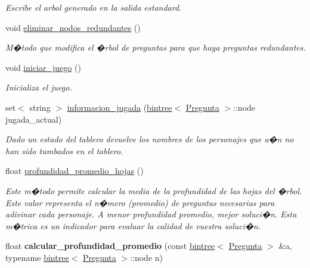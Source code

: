 \begin{DoxyCompactItemize}
\begin{DoxyCompactList}\small\item\em Escribe el arbol generado en la salida estandard. \end{DoxyCompactList}\item 
void \hyperlink{classQuienEsQuien_a010586f119ad0966d35c64382a64e3bc}{eliminar\+\_\+nodos\+\_\+redundantes} ()
\begin{DoxyCompactList}\small\item\em M�todo que modifica el �rbol de preguntas para que haya preguntas redundantes. \end{DoxyCompactList}\item 
void \hyperlink{classQuienEsQuien_a381bcd553e7c0231bb1f33e67ae3c653}{iniciar\+\_\+juego} ()
\begin{DoxyCompactList}\small\item\em Inicializa el juego. \end{DoxyCompactList}\item 
set$<$ string $>$ \hyperlink{classQuienEsQuien_a16816dd39d95ad489e44469f89fabbd4}{informacion\+\_\+jugada} (\hyperlink{classbintree}{bintree}$<$ \hyperlink{classPregunta}{Pregunta} $>$\+::node jugada\+\_\+actual)
\begin{DoxyCompactList}\small\item\em Dado un estado del tablero devuelve los nombres de los personajes que a�n no han sido tumbados en el tablero. \end{DoxyCompactList}\item 
float \hyperlink{classQuienEsQuien_ae999ad6c20f9ebf6a710060b99741126}{profundidad\+\_\+promedio\+\_\+hojas} ()
\begin{DoxyCompactList}\small\item\em Este m�todo permite calcular la media de la profundidad de las hojas del �rbol. Este valor representa el n�mero (promedio) de preguntas necesarias para adivinar cada personaje. A menor profundidad promedio, mejor soluci�n. Esta m�trica es un indicador para evaluar la calidad de vuestra soluci�n. \end{DoxyCompactList}\item 
float {\bfseries calcular\+\_\+profundidad\+\_\+promedio} (const \hyperlink{classbintree}{bintree}$<$ \hyperlink{classPregunta}{Pregunta} $>$ \&a, typename \hyperlink{classbintree}{bintree}$<$ \hyperlink{classPregunta}{Pregunta} $>$\+::node n)\hypertarget{classQuienEsQuien_a7a23fb258645c36fc3710daa554fa712}{}\label{classQuienEsQuien_a7a23fb258645c36fc3710daa554fa712}


\end{DoxyCompactItemize}
